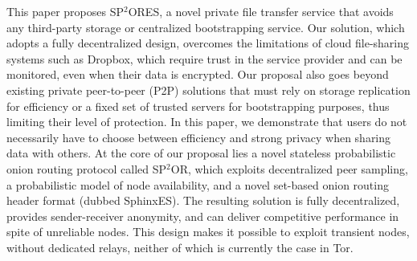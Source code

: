 %
This paper proposes SP$^2$ORES, a novel private file transfer service that avoids any third-party storage or centralized bootstrapping service.
Our solution, which adopts a fully decentralized design, overcomes the limitations of cloud file-sharing systems such as Dropbox, which require trust in the service provider and can be monitored, even when their data is encrypted. Our proposal also goes beyond existing private peer-to-peer (P2P) solutions that must rely on storage replication for efficiency or a fixed set of trusted servers for bootstrapping purposes, thus limiting their level of protection. %
In this paper, we demonstrate that users do not necessarily have to choose between efficiency and strong privacy when sharing data with others. %
 At the core of our proposal lies a novel stateless probabilistic onion routing protocol called SP$^2$OR, which exploits decentralized peer sampling, a probabilistic model of node availability, and a novel set-based onion routing header format (dubbed SphinxES). 
The resulting solution is fully decentralized, provides sender-receiver anonymity, and can deliver competitive performance in spite of unreliable nodes. %
This design makes it possible to exploit transient nodes, without dedicated relays, %
neither of which is currently the case in \ac{Tor}.
 

